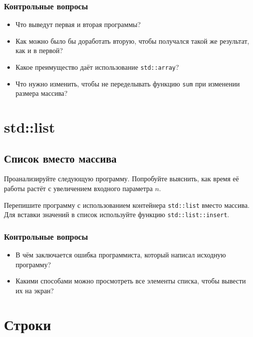 \documentclass[10pt,twoside,openany]{book}
\begin{document}




\subsection*{Контрольные вопросы}

\begin{itemize}
    \item Что выведут первая и вторая программы?
    \item Как можно было бы доработать вторую, чтобы получался такой же результат, как и в первой?
    \item Какое преимущество даёт использование {\tt std::array}?
    \item Что нужно изменить, чтобы не переделывать функцию {\tt sum} при изменении размера массива?
\end{itemize}

\chapter{std::list}

\section{Список вместо массива}

Проанализируйте следующую программу. Попробуйте выяснить, как время её работы растёт
с увеличением входного параметра $n$.



Перепишите программу с использованием контейнера {\tt std::list} вместо массива.
Для вставки значений в список используйте функцию {\tt std::list::insert}.

\subsection*{Контрольные вопросы}

\begin{itemize}
    \item В чём заключается ошибка программиста, который написал исходную программу?
    \item Какими способами можно просмотреть все элементы списка, чтобы вывести их на экран?
\end{itemize}

\chapter{Строки}
\end{document}
